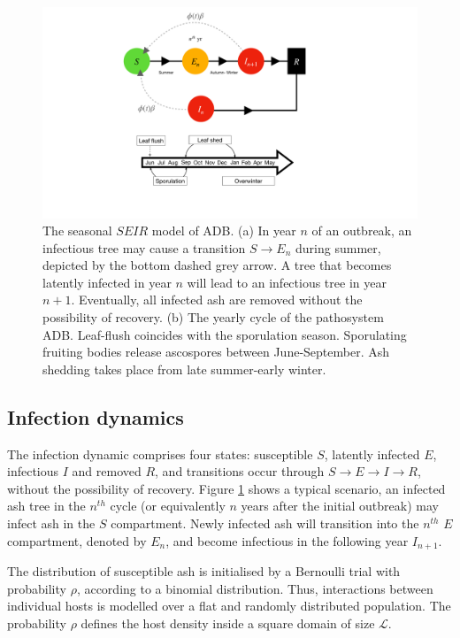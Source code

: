 \begin{figure}
    \centering
    \includegraphics[scale=0.40]{chapter6/figures/fig1-seir-transitions.pdf}
    \caption{The seasonal $SEIR$ model of ADB. (a) In year $n$ of an outbreak, an infectious tree may cause a transition $S\rightarrow E_n$ during summer, depicted by the bottom dashed grey arrow. A tree that becomes latently infected in year $n$ will lead to an infectious tree in year $n+1$. Eventually, all infected ash are removed without the possibility of recovery. (b) The yearly cycle of the pathosystem ADB. Leaf-flush coincides with the sporulation season. Sporulating fruiting bodies release ascospores between June-September. Ash shedding takes place from late summer-early winter. }
    \label{fig:SEIR-transitions}
\end{figure}

\subsection{Infection dynamics}
\label{sec:infection-dynamics}

The infection dynamic comprises four states: susceptible $S$, latently infected $E$, infectious $I$ and removed $R$, and transitions occur through $S\rightarrow E \rightarrow I \rightarrow R$, without the possibility of recovery. 
Figure \ref{fig:SEIR-transitions} shows a typical scenario, an infected ash tree in the $n^{th}$ cycle (or equivalently $n$ years after the initial outbreak) may infect ash in the $S$ compartment. Newly infected ash will transition into the $n^{th}$ $E$ compartment, denoted by $E_n$, and become infectious in the following year $I_{n+1}$.

The distribution of susceptible ash is initialised by a Bernoulli trial with probability $\rho$, according to a binomial distribution.
Thus, interactions between individual hosts is modelled over a flat and randomly distributed population.
The probability $\rho$ defines the host density inside a square domain of size $\mathcal{L}$. 

